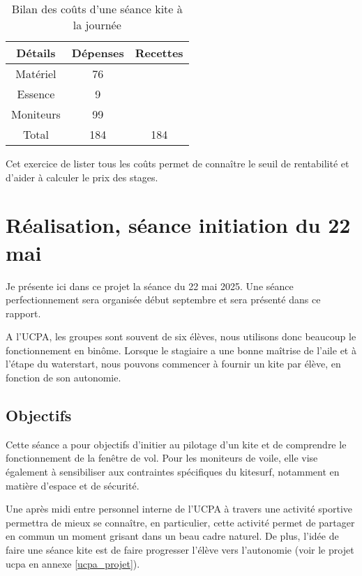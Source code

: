 \documentclass[11pt,a4paper]{report}
\begin{document}
\begin{table}
\begin{centering}
\begin{tabular}{|c|c|c|}
\hline
\textbf{Détails}         & \textbf{Dépenses} & \textbf{Recettes}   \\
\hline
Matériel  & 76     &                     \\
\hline                                    
Essence   & 9      &                     \\
\hline              
Moniteurs  & 99    &                     \\
\hline
Total     & 184    &       184           \\
\hline
\end{tabular}
\caption{Bilan des co\^uts d'une séance kite à la journée\label{cout_journalier}}
\end{centering}
\end{table}

Cet exercice de lister tous les co\^uts permet de connaître le seuil 
de rentabilité et d'aider à calculer le prix des stages.
\FloatBarrier
\section{Réalisation, séance initiation du 22 mai}
Je présente ici dans ce projet la séance du 22 mai 2025.
Une séance perfectionnement sera organisée début septembre
et sera présenté dans ce rapport.

A l'UCPA, les groupes sont souvent de six élèves, nous
utilisons donc beaucoup le fonctionnement en bin\^ome. 
Lorsque le stagiaire a une bonne maîtrise de l'aile et
à l'étape du waterstart, nous pouvons commencer à fournir
un kite par élève, en fonction de son autonomie.
\subsection{Objectifs}
Cette séance a pour objectifs d’initier au pilotage d’un kite et
de comprendre le fonctionnement de la fenêtre de vol. 
Pour les moniteurs de voile, elle vise également à 
sensibiliser aux contraintes spécifiques du kitesurf, 
notamment en matière d’espace et de sécurité.
 
Une après midi entre personnel interne de l'UCPA à travers une 
activité sportive permettra  de mieux se connaître, 
en particulier, cette activité permet de partager en commun
un moment grisant dans un beau cadre naturel. De plus, l'idée
de faire une séance kite est de faire progresser l'élève vers 
l'autonomie (voir le projet ucpa en annexe \ref{ucpa_projet}).
\end{document}
